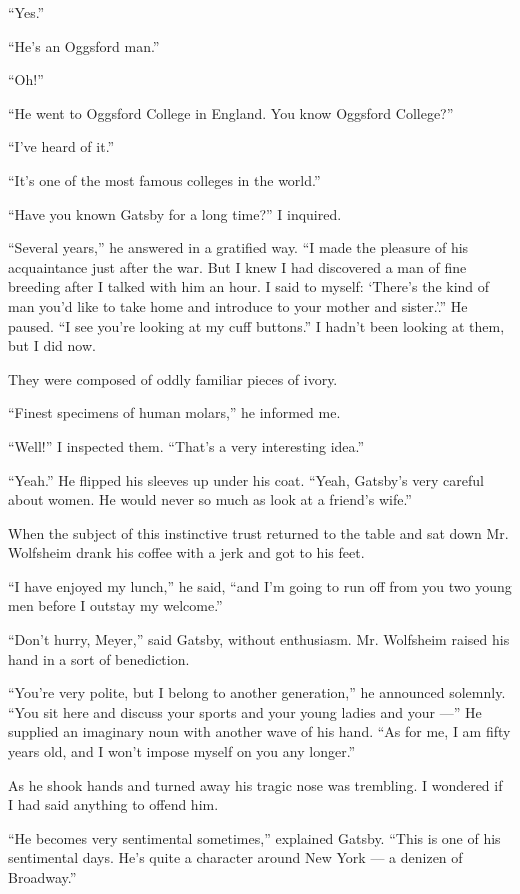 \documentclass{znotebook}
\begin{document}
``Yes.''

``He's an Oggsford man.''

``Oh!''

``He went to Oggsford College in England. You know Oggsford College?''

``I've heard of it.''

``It's one of the most famous colleges in the world.''

``Have you known Gatsby for a long time?'' I inquired.

``Several years,'' he answered in a gratified way. ``I made the pleasure of his acquaintance just after the war. But I knew I had discovered a man of fine breeding after I talked with him an hour. I said to myself: ‘There's the kind of man you'd like to take home and introduce to your mother and sister.'.'' He paused. ``I see you're looking at my cuff buttons.'' I hadn't been looking at them, but I did now.

They were composed of oddly familiar pieces of ivory.

``Finest specimens of human molars,'' he informed me.

``Well!'' I inspected them. ``That's a very interesting idea.''

``Yeah.'' He flipped his sleeves up under his coat. ``Yeah, Gatsby's very careful about women. He would never so much as look at a friend's wife.''

When the subject of this instinctive trust returned to the table and sat down Mr. Wolfsheim drank his coffee with a jerk and got to his feet.

``I have enjoyed my lunch,'' he said, ``and I'm going to run off from you two young men before I outstay my welcome.''

``Don't hurry, Meyer,'' said Gatsby, without enthusiasm. Mr. Wolfsheim raised his hand in a sort of benediction.

``You're very polite, but I belong to another generation,'' he announced solemnly. ``You sit here and discuss your sports and your young ladies and your ---'' He supplied an imaginary noun with another wave of his hand. ``As for me, I am fifty years old, and I won't impose myself on you any longer.''

As he shook hands and turned away his tragic nose was trembling. I wondered if I had said anything to offend him.

``He becomes very sentimental sometimes,'' explained Gatsby. ``This is one of his sentimental days. He's quite a character around New York ---{} a denizen of Broadway.''
\end{document}
